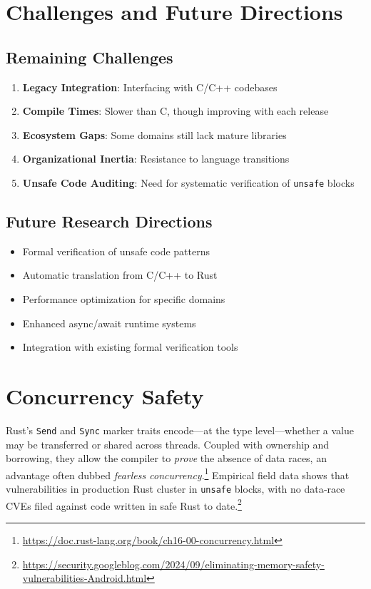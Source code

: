 \documentclass[11pt]{article}
\begin{document}
\section{Challenges and Future Directions}

\subsection{Remaining Challenges}
\begin{enumerate}
    \item \textbf{Legacy Integration}: Interfacing with C/C++ codebases
    \item \textbf{Compile Times}: Slower than C, though improving with each release
    \item \textbf{Ecosystem Gaps}: Some domains still lack mature libraries
    \item \textbf{Organizational Inertia}: Resistance to language transitions
    \item \textbf{Unsafe Code Auditing}: Need for systematic verification of \texttt{unsafe} blocks
\end{enumerate}

\subsection{Future Research Directions}
\begin{itemize}
    \item Formal verification of unsafe code patterns
    \item Automatic translation from C/C++ to Rust
    \item Performance optimization for specific domains
    \item Enhanced async/await runtime systems
    \item Integration with existing formal verification tools
\end{itemize}

\newpage
\section{Concurrency Safety}
\label{sec:concurrency-safety}

Rust's \texttt{Send} and \texttt{Sync} marker traits encode—at the type level—whether a value may be transferred or shared across threads.  
Coupled with ownership and borrowing, they allow the compiler to \emph{prove} the absence of data races, an advantage often dubbed \emph{fearless concurrency}.\footnote{\url{https://doc.rust-lang.org/book/ch16-00-concurrency.html}}  
Empirical field data shows that vulnerabilities in production Rust cluster in \texttt{unsafe} blocks, with no data‑race CVEs filed against code written in safe Rust to date.\footnote{\url{https://security.googleblog.com/2024/09/eliminating-memory-safety-vulnerabilities-Android.html}}
\end{document}
